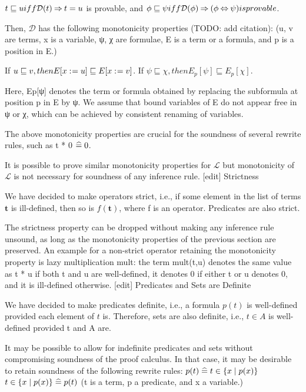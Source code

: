     $t \sqsubseteq u iff \mathcal{D}(t)\mathbin\Rightarrow t=u$ is provable, and
   $ \phi\sqsubseteq\psi iff \mathcal{D}(\phi)\mathbin\Rightarrow (\phi\mathbin\Leftrightarrow\psi) is provable$. 

Then, $\mathcal{D}$ has the following monotonicity properties (TODO: add citation):
(u, v are terms, x is a variable, ψ, χ are formulae, E is a term or a formula, and p is a position in E.)

    If $u \sqsubseteq v, then E[x\mathrel{:\mkern1mu=} u] \sqsubseteq E[x\mathrel{:\mkern1mu=} v]$.
    If $\psi \sqsubseteq \chi, then E_p[\psi] \sqsubseteq E_p[\chi]$.

Here, Ep[ψ] denotes the term or formula obtained by replacing the subformula at position p in E by ψ. We assume that bound variables of E do not appear free in ψ or χ, which can be achieved by consistent renaming of variables.

The above monotonicity properties are crucial for the soundness of several rewrite rules, such as t * 0 $\mathrel{\widehat=} 0$.

It is possible to prove similar monotonicity properties for $\mathcal{L}$ but monotonicity of $\mathcal{L}$ is not necessary for soundness of any inference rule.
[edit] Strictness

We have decided to make operators strict, i.e., if some element in the list of terms $\mathbf{t}$ is ill-defined, then so is $f(\mathbf{t})$, where f is an operator. Predicates are also strict.

The strictness property can be dropped without making any inference rule unsound, as long as the monotonicity properties of the previous section are preserved. An example for a non-strict operator retaining the monotonicity property is lazy multiplication mult: the term mult(t,u) denotes the same value as t * u if both t and u are well-defined, it denotes 0 if either t or u denotes 0, and it is ill-defined otherwise.
[edit] Predicates and Sets are Definite

We have decided to make predicates definite, i.e., a formula $p(t)$ is well-defined provided each element of $t$ is. Therefore, sets are also definite, i.e., $t \in A$ is well-defined provided t and A are.

It may be possible to allow for indefinite predicates and sets without compromising soundness of the proof calculus. In that case, it may be desirable to retain soundness of the following rewrite rules:
$p(t) \mathrel{\widehat=} t \in \{x\mid p(x)\}$
$t\in\{x\mid p(x)\} \mathrel{\widehat=} p(t)$
(t is a term, p a predicate, and x a variable.) 


